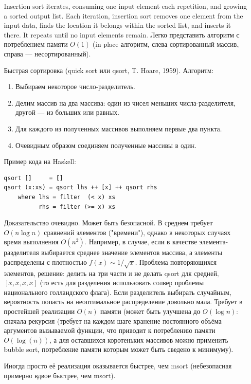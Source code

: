 \documentclass{book}
\begin{document}
Insertion sort iterates, consuming one input element each repetition, and growing a sorted output
list. Each iteration, insertion sort removes one element from the input data, finds the location
it belongs within the sorted list, and inserts it there. It repeats until no input elements
remain. Легко представить алгоритм с потреблением памяти $O(1)$ (in-place алгоритм, слева
сортированный массив, справа --- несортированный).

Быстрая сортировка (quick sort или qsort, T. Hoare, 1959). Алгоритм:
\begin{enumerate}
  \item Выбираем некоторое число-разделитель.
  \item Делим массив на два массива: один из чисел меньших числа-разделителя,
    другой --- из больших или равных.
  \item Для каждого из полученных массивов выполняем первые два пункта.
  \item Очевидным образом соединяем полученные массивы в один.
\end{enumerate}
Пример кода на Haskell:
\begin{verbatim}
qsort []     = []
qsort (x:xs) = qsort lhs ++ [x] ++ qsort rhs
    where lhs = filter  (< x) xs
          rhs = filter (>= x) xs
\end{verbatim}
Доказательство очевидно. Может быть безопасной. В среднем требует $O(n\log n)$ сравнений элементов
("времени"), однако в некоторых случаях время выполнения $O(n^2)$. Например, в случае, если в
качестве элемента-разделителя выбирается среднее значение элементов массива, а элементы
распределены с плотностью $f(x) \sim 1 / \sqrt{x}$. Проблема повторяющихся элементов, решение: делить на три
части и не делать qsort для средней, $[x,x,x,x]$ (то есть для разделения использовать солвер
проблемы национального голландского флага). Если разделитель выбирать случайным, вероятность
попасть на неоптимальное распределение довольно мала.
Требует в простейшей реализации $O(n)$ памяти (может быть улучшена до
$O(\log n)$: сначала рекурсия (требует на каждом шаге хранение постоянного объёма аргументов
вызываемой функции, что приводит к потреблению памяти $O(\log(n))$, а для оставшихся коротеньких
массивов можно применить bubble sort, потребление памяти которым может быть сведено к минимуму).

Иногда просто её реализация оказывается
быстрее, чем msort (небезопасная примерно вдвое быстрее, чем msort).
\end{document}
